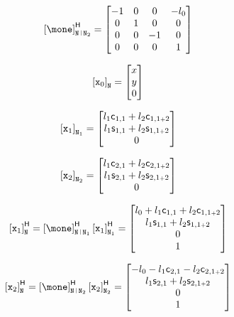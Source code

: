 \documentclass[a4paper,11pt,brazil,fleqn]{article}
\begin{document}
\begin{itemize}
\begin{equation}
\hvct{\mone}_{\ttN \rl \ttN_2} =
\begin{bmatrix}
-1 & 0 & 0 & -l_0 \\
0 & 1 & 0 & 0 \\
0 & 0 & -1 & 0\\
0 & 0 & 0 & 1
\end{bmatrix}
\end{equation}

\begin{equation}
\left[ \mathtt{x}_0 \right]_{\mathtt{N}} =
\begin{bmatrix}
x \\
y \\
0 \\
\end{bmatrix}
\end{equation}

\begin{equation}
\left[ \mathtt{x}_1 \right]_{\mathtt{N}_1} =
\begin{bmatrix}
l_1 \mathsf{c}_{1,1} + l_2 \mathsf{c}_{1,1{\scriptscriptstyle +} 2} \\
l_1 \mathsf{s}_{1,1} + l_2 \mathsf{s}_{1,1{\scriptscriptstyle +} 2} \\
0
\end{bmatrix}
\end{equation}

\begin{equation}
\left[ \mathtt{x}_2 \right]_{\mathtt{N}_2} =
\begin{bmatrix}
l_1 \mathsf{c}_{2,1} + l_2 \mathsf{c}_{2,1{\scriptscriptstyle +} 2} \\
l_1 \mathsf{s}_{2,1} + l_2 \mathsf{s}_{2,1{\scriptscriptstyle +} 2} \\
0
\end{bmatrix}
\end{equation}

\begin{equation}
\hvct{\ttx_1}_{\ttN} = \hvct{\mone}_{\ttN \rl \ttN_1} \hvct{\ttx_1}_{\ttN_1} =
\begin{bmatrix}
l_0 + l_1 \ccos_{1,1} + l_2 \ccos_{1,1\plus 2} \\
l_1 \ssin_{1,1} + l_2 \ssin_{1,1\plus 2} \\
0 \\
1
\end{bmatrix}
\end{equation}

\begin{equation}
\hvct{\ttx_2}_{\ttN} = \hvct{\mone}_{\ttN \rl \ttN_2} \hvct{\ttx_2}_{\ttN_2} =
\begin{bmatrix}
-l_0 - l_1 \ccos_{2,1} - l_2 \ccos_{2,1\plus 2} \\
l_1 \ssin_{2,1} + l_2 \ssin_{2,1\plus 2} \\
0 \\
1
\end{bmatrix}
\end{equation}


\end{itemize}
\end{document}
